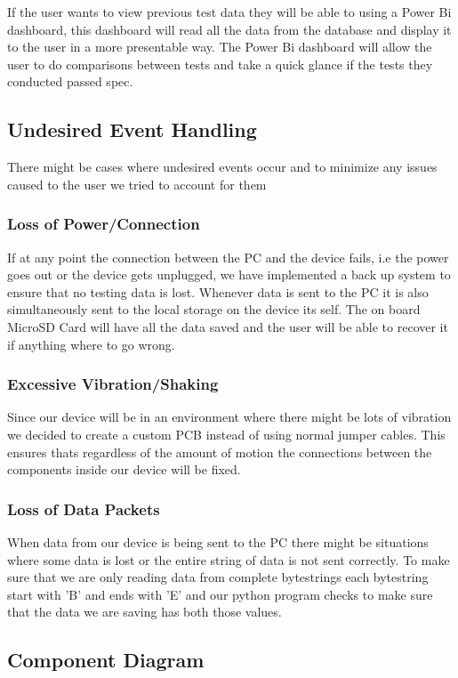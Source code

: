 \documentclass[12pt, titlepage]{article}
\begin{document}
If the user wants to view previous test data they will be able to using a Power Bi dashboard, this dashboard will read all the data from the database and display it to the user in a more presentable way. The Power Bi dashboard will allow the user to do comparisons between tests and take a quick glance if the tests they conducted passed spec.

\subsection{Undesired Event Handling}
There might be cases where undesired events occur and to minimize any issues caused to the user we tried to account for them
\subsubsection{Loss of Power/Connection}
If at any point the connection between the PC and the device fails, i.e the power goes out or the device gets unplugged, we have implemented a back up system to ensure that no testing data is lost. Whenever data is sent to the PC it is also simultaneously sent to the local storage on the device its self. The on board MicroSD Card will have all the data saved and the user will be able to recover it if anything where to go wrong.

\subsubsection{Excessive Vibration/Shaking}
Since our device will be in an environment where there might be lots of vibration we decided to create a custom PCB instead of using normal jumper cables. This ensures thats regardless of the amount of motion the connections between the components inside our device will be fixed.

\subsubsection{Loss of Data Packets}
When data from our device is being sent to the PC there might be situations where some data is lost or the entire string of data is not sent correctly. To make sure that we are only reading data from complete bytestrings each bytestring start with 'B' and ends with 'E' and our python program checks to make sure that the data we are saving has both those values.


\subsection{Component Diagram}
\end{document}
